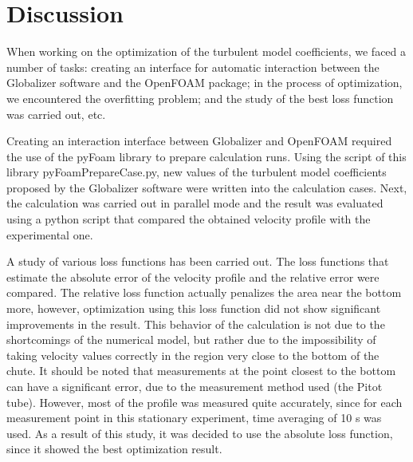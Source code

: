 \documentclass[mathematics,article,accept,pdftex,moreauthors]{Definitions/mdpi}
\begin{document}
\section{Discussion}\label{sec6}

When working on the optimization of the turbulent model coefficients, we faced a number of tasks: creating an interface for automatic interaction between the Globalizer software and the OpenFOAM package; in the process of optimization, we encountered the overfitting problem; and the study of the best loss function was carried out, etc.

Creating an interaction interface between Globalizer and OpenFOAM required the use of the pyFoam library to prepare calculation runs. Using the script of this library pyFoamPrepareCase.py, new values of the turbulent model coefficients proposed by the Globalizer software were written into the calculation cases. Next, the calculation was carried out in parallel mode and the result was evaluated using a python script that compared the obtained velocity profile with the experimental one.

A study of various loss functions has been carried out. The loss functions that estimate the absolute error of the velocity profile and the relative error were compared. The relative loss function actually penalizes the area near the bottom more, however, optimization using this loss function did not show significant improvements in the result. This behavior of the calculation is not due to the shortcomings of the numerical model, but rather due to the impossibility of taking velocity values correctly in the region very close to the bottom of the chute. It should be noted that measurements at the point closest to the bottom can have a significant error, due to the measurement method used (the Pitot tube). However, most of the profile was measured quite accurately, since for each measurement point in this stationary experiment, time averaging of 10 s was used. As a result of this study, it was decided to use the absolute loss function, since it showed the best optimization result.
\end{document}
